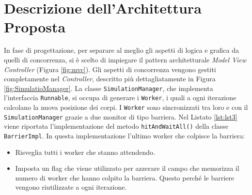 \documentclass[12pt,a4paper,openright,twoside]{book}
\begin{document}
\chapter{Descrizione dell'Architettura Proposta}
\label{chap:Descrizione dell'Architettura Proposta}

In fase di progettazione, per separare al meglio gli aspetti di logica e grafica da quelli di concorrenza, si è scelto di
impiegare il pattern architetturale \textit{Model View Controller} (Figura \ref{fig:mvc}).
Gli aspetti di concorrenza vengono gestiti completamente nel \textit{Controller},
descritto più dettagliatamente in Figura \ref{fig:SimulatioManager}.
La classe \texttt{SimulationManager}, che implementa l'interfaccia \texttt{Runnable},
si occupa di generare i \texttt{Worker}, i quali a ogni iterazione
calcolano la nuova posizione dei corpi.
I \texttt{Worker} sono sincronizzati tra loro e con il \texttt{SimulationManager}
grazie a due monitor di tipo barriera.
Nel Listato \ref{lst:lst3} viene riportata l'implementazione del metodo \texttt{hitAndWaitAll()} della classe \texttt{BarrierImpl}.
In questa implementazione l'ultimo worker che colpisce la barriera:
\begin{itemize}
	\item Risveglia tutti i worker che stanno attendendo.
	\item Imposta un flag che viene utilizzato per azzerare il campo
	che memorizza il numero di worker che hanno colpito la barriera.
	Questo perché le barriere vengono riutilizzate a ogni iterazione.
\end{itemize}
\end{document}
